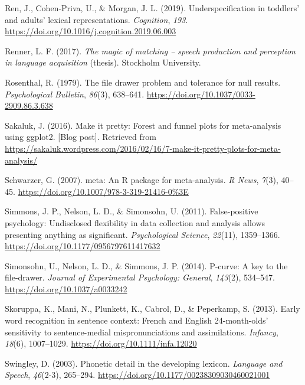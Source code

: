 \documentclass[
  english,
  man, noextraspace]{apa6}
\newlength{\cslhangindent}
\newenvironment{cslreferences}%
  {\setlength{\parindent}{0pt}%
  \everypar{\setlength{\hangindent}{\cslhangindent}}\ignorespaces}%
  {\par}
\begin{document}
\begin{cslreferences}
\leavevmode\hypertarget{ref-Ren}{}%
Ren, J., Cohen-Priva, U., \& Morgan, J. L. (2019). Underspecification in toddlers' and adults' lexical representations. \emph{Cognition}, \emph{193}. \url{https://doi.org/10.1016/j.cognition.2019.06.003}

\leavevmode\hypertarget{ref-Renner2017}{}%
Renner, L. F. (2017). \emph{The magic of matching -- speech production and perception in language acquisition} (thesis). Stockholm University.

\leavevmode\hypertarget{ref-Rosenthal1979}{}%
Rosenthal, R. (1979). The file drawer problem and tolerance for null results. \emph{Psychological Bulletin}, \emph{86}(3), 638--641. \url{https://doi.org/10.1037/0033-2909.86.3.638}

\leavevmode\hypertarget{ref-Sakaluk2016}{}%
Sakaluk, J. (2016). Make it pretty: Forest and funnel plots for meta-analysis using ggplot2. {[}Blog post{]}. Retrieved from \url{https://sakaluk.wordpress.com/2016/02/16/7-make-it-pretty-plots-for-meta-analysis/}

\leavevmode\hypertarget{ref-meta}{}%
Schwarzer, G. (2007). meta: An R package for meta-analysis. \emph{R News}, \emph{7}(3), 40--45. \url{https://doi.org/10.1007/978-3-319-21416-0\%3E}

\leavevmode\hypertarget{ref-Simmons2011}{}%
Simmons, J. P., Nelson, L. D., \& Simonsohn, U. (2011). False-positive psychology: Undisclosed flexibility in data collection and analysis allows presenting anything as significant. \emph{Psychological Science}, \emph{22}(11), 1359--1366. \url{https://doi.org/10.1177/0956797611417632}

\leavevmode\hypertarget{ref-pcurve}{}%
Simonsohn, U., Nelson, L. D., \& Simmons, J. P. (2014). P-curve: A key to the file-drawer. \emph{Journal of Experimental Psychology: General}, \emph{143}(2), 534--547. \url{https://doi.org/10.1037/a0033242}

\leavevmode\hypertarget{ref-Skoruppa2013}{}%
Skoruppa, K., Mani, N., Plunkett, K., Cabrol, D., \& Peperkamp, S. (2013). Early word recognition in sentence context: French and English 24-month-olds' sensitivity to sentence-medial mispronunciations and assimilations. \emph{Infancy}, \emph{18}(6), 1007--1029. \url{https://doi.org/10.1111/infa.12020}

\leavevmode\hypertarget{ref-Swingley2003}{}%
Swingley, D. (2003). Phonetic detail in the developing lexicon. \emph{Language and Speech}, \emph{46}(2-3), 265--294. \url{https://doi.org/10.1177/00238309030460021001}


\end{cslreferences}
\end{document}
